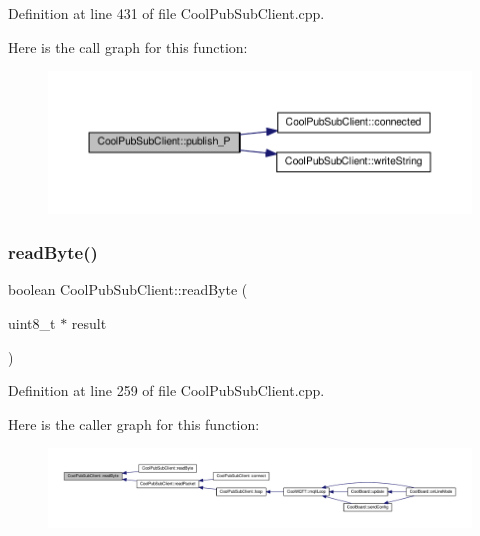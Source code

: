Definition at line 431 of file Cool\+Pub\+Sub\+Client.\+cpp.

Here is the call graph for this function\+:\nopagebreak
\begin{figure}[H]
\begin{center}
\leavevmode
\includegraphics[width=350pt]{class_cool_pub_sub_client_a55458d47cf01f590e9b6647d5a418ab6_cgraph}
\end{center}
\end{figure}
\mbox{\label{class_cool_pub_sub_client_ad409bbd287d5894f0cf082f62446c002}} 
\subsubsection{\texorpdfstring{read\+Byte()}{readByte()}\hspace{0.1cm}{\footnotesize\ttfamily [1/2]}}
{\footnotesize\ttfamily boolean Cool\+Pub\+Sub\+Client\+::read\+Byte (\begin{DoxyParamCaption}\item[{uint8\+\_\+t $\ast$}]{result }\end{DoxyParamCaption})\hspace{0.3cm}{\ttfamily [private]}}



Definition at line 259 of file Cool\+Pub\+Sub\+Client.\+cpp.

Here is the caller graph for this function\+:\nopagebreak
\begin{figure}[H]
\begin{center}
\leavevmode
\includegraphics[width=350pt]{class_cool_pub_sub_client_ad409bbd287d5894f0cf082f62446c002_icgraph}
\end{center}
\end{figure}
\mbox{\label{class_cool_pub_sub_client_abef3735bb9a2a8c87b3da659dc4ade03}} 
